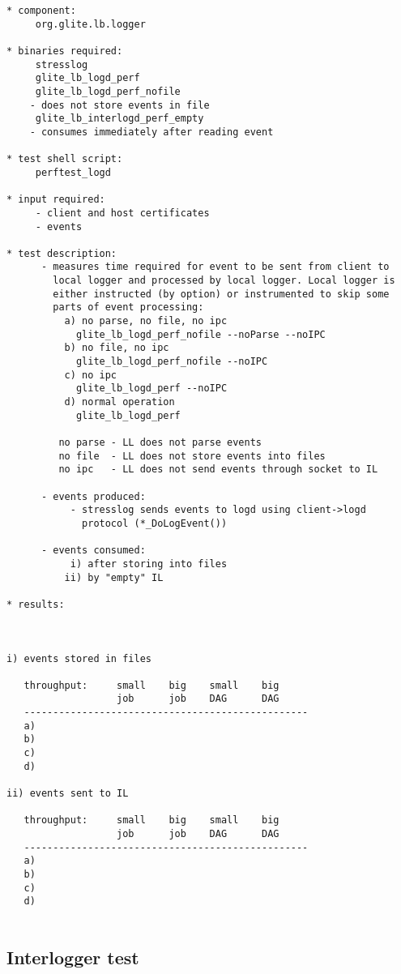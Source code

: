\begin{verbatim}
* component:
     org.glite.lb.logger

* binaries required:
     stresslog
     glite_lb_logd_perf
     glite_lb_logd_perf_nofile
	- does not store events in file
     glite_lb_interlogd_perf_empty
	- consumes immediately after reading event

* test shell script:
     perftest_logd

* input required:
     - client and host certificates
     - events

* test description:
      - measures time required for event to be sent from client to
        local logger and processed by local logger. Local logger is
        either instructed (by option) or instrumented to skip some
        parts of event processing:
	      a) no parse, no file, no ipc
		    glite_lb_logd_perf_nofile --noParse --noIPC
	      b) no file, no ipc
		    glite_lb_logd_perf_nofile --noIPC
	      c) no ipc
		    glite_lb_logd_perf --noIPC
	      d) normal operation
		    glite_lb_logd_perf

         no parse - LL does not parse events
         no file  - LL does not store events into files
         no ipc   - LL does not send events through socket to IL

      - events produced:
           - stresslog sends events to logd using client->logd
             protocol (*_DoLogEvent())

      - events consumed:
           i) after storing into files
          ii) by "empty" IL

* results:



i) events stored in files

   throughput:     small    big    small    big
                   job      job    DAG      DAG
   -------------------------------------------------
   a)
   b)
   c)
   d)

ii) events sent to IL

   throughput:     small    big    small    big
                   job      job    DAG      DAG
   -------------------------------------------------
   a)
   b)
   c)
   d)


\end{verbatim}

\subsection{Interlogger test}


